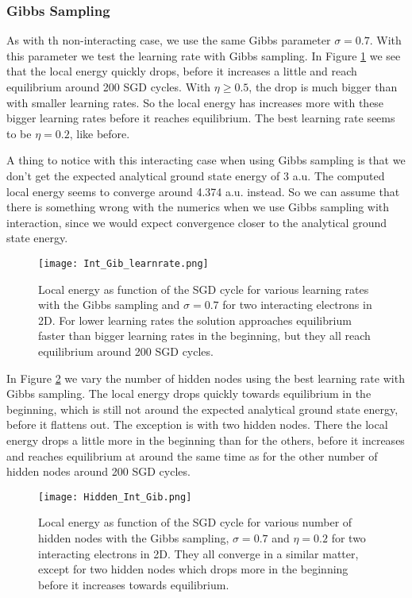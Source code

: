 \documentclass[12pt,a4paper,english]{article}
\begin{document}
\subsubsection{Gibbs Sampling}
\label{subsubsect:Results_int_Gibbs}
As with th non-interacting case, we use the same Gibbs parameter $\sigma=0.7$. With this parameter we test the learning rate with Gibbs sampling. In Figure \ref{fig:check_learnrate_Int_Gib} we see that the local energy quickly drops, before it increases a little and reach equilibrium around 200 SGD cycles. With $\eta\geq0.5$, the drop is much bigger than with smaller learning rates. So the local energy has increases more with these bigger learning rates before it reaches equilibrium. The best learning rate seems to be $\eta=0.2$, like before.

A thing to notice with this interacting case when using Gibbs sampling is that we don't get the expected analytical ground state energy of 3 a.u. The computed local energy seems to converge around 4.374 a.u. instead. So we can assume that there is something wrong with the numerics when we use Gibbs sampling with interaction, since we would expect convergence closer to the analytical ground state energy. 

\begin{figure}[htbp!]
	\centering\texttt{[image: Int\_Gib\_learnrate.png]}
	\caption{Local energy as function of the SGD cycle for various learning rates with the Gibbs sampling and $\sigma=0.7$ for two interacting electrons in 2D. For lower learning rates the solution approaches equilibrium faster than bigger learning rates in the beginning, but they all reach equilibrium around 200 SGD cycles. \label{fig:check_learnrate_Int_Gib}}
\end{figure}

In Figure \ref{fig:check_hidden_Int_Gib} we vary the number of hidden nodes using the best learning rate with Gibbs sampling. The local energy drops quickly towards equilibrium in the beginning, which is still not around the expected analytical ground state energy, before it flattens out. The exception is with two hidden nodes. There the local energy drops a little more in the beginning than for the others, before it increases and reaches equilibrium at around the same time as for the other number of hidden nodes around 200 SGD cycles. 

\begin{figure}[htbp!]
	\centering\texttt{[image: Hidden\_Int\_Gib.png]}
	\caption{Local energy as function of the SGD cycle for various number of hidden nodes with the Gibbs sampling, $\sigma=0.7$ and $\eta=0.2$ for two interacting electrons in 2D. They all converge in a similar matter, except for two hidden nodes which drops more in the beginning before it increases towards equilibrium. \label{fig:check_hidden_Int_Gib}}
\end{figure}
\end{document}
